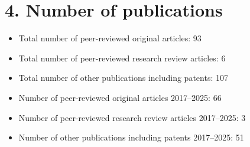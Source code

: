 \documentclass[11pt,a4paper]{article}
\begin{document}
\section*{4. Number of publications}

\begin{itemize}
\item Total number of peer-reviewed original articles: 93
\item Total number of peer-reviewed research review articles: 6
\item Total number of other publications including patents: 107
\item Number of peer-reviewed original articles 2017--2025: 66
\item Number of peer-reviewed research review articles 2017--2025: 3
\item Number of other publications including patents 2017--2025: 51
\end{itemize}
\end{document}
